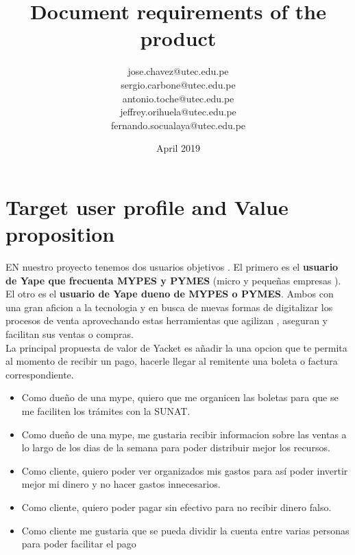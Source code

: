 \documentclass{article}
\title{Document requirements of the product}
\author{jose.chavez@utec.edu.pe \\ sergio.carbone@utec.edu.pe\\antonio.toche@utec.edu.pe\\jeffrey.orihuela@utec.edu.pe\\fernando.socualaya@utec.edu.pe}
\date{April 2019}
\begin{document}
\maketitle

\section{Target user profile and Value proposition}
    EN nuestro proyecto tenemos dos usuarios objetivos . El primero es el \textbf{ usuario de Yape que frecuenta MYPES y PYMES} (micro y pequeñas empresas ). El otro es el \textbf{usuario de Yape dueno de MYPES o PYMES}. Ambos con una gran aficion a la tecnologia y en busca de nuevas formas de digitalizar los procesos de venta aprovechando estas herramientas que agilizan , aseguran y facilitan sus ventas o compras.\\ La principal propuesta de valor de Yacket es añadir la una opcion que te permita al momento de recibir un pago, hacerle llegar al remitente una boleta o factura correspondiente.     
    \begin{itemize}
    \item Como dueño de una mype, quiero que me organicen las boletas para que se me faciliten los trámites con la SUNAT.
    \item Como dueño de una mype, me gustaria recibir informacion sobre las ventas a lo largo de los dias de la semana para poder distribuir mejor los recursos.
    \item Como cliente, quiero poder ver organizados mis gastos para así poder invertir mejor mi dinero y no hacer gastos innecesarios.
    \item Como cliente, quiero poder pagar sin efectivo para no recibir dinero falso.
    \item Como cliente me gustaria que se pueda dividir la cuenta entre varias personas para poder facilitar el pago



    \end{itemize}
    
\end{document}
